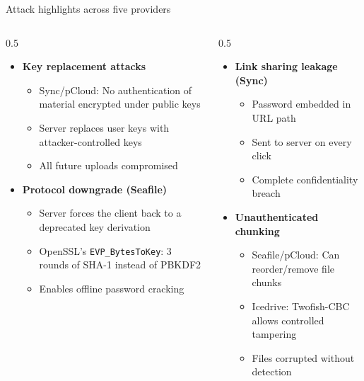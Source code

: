 \ifdefined\PRESENTATION\else\PassOptionsToClass{handout}{beamer}\fi\documentclass[aspectratio=169, lualatex]{beamer}
\begin{document}
\begin{frame}{Attack highlights across five providers}
	\begin{columns}[c]
		\begin{column}{0.5\textwidth}
			\begin{itemize}
				\item \textbf{Key replacement attacks}
				      \begin{itemize}
					      \item Sync/pCloud: No authentication of material encrypted under public keys
					      \item Server replaces user keys with attacker-controlled keys
					      \item All future uploads compromised
				      \end{itemize}
			\end{itemize}
			\vspace{0.3cm}
			\begin{itemize}
				\item \textbf{Protocol downgrade (Seafile)}
				      \begin{itemize}
					      \item Server forces the client back to a deprecated key derivation
					      \item OpenSSL's \texttt{EVP\_BytesToKey}: 3 rounds of SHA-1 instead of PBKDF2
					      \item Enables offline password cracking
				      \end{itemize}
			\end{itemize}
		\end{column}
		\begin{column}{0.5\textwidth}
			\begin{itemize}
				\item \textbf{Link sharing leakage (Sync)}
				      \begin{itemize}
					      \item Password embedded in URL path
					      \item Sent to server on every click
					      \item Complete confidentiality breach
				      \end{itemize}
			\end{itemize}
			\vspace{0.3cm}
			\begin{itemize}
				\item \textbf{Unauthenticated chunking}
				      \begin{itemize}
					      \item Seafile/pCloud: Can reorder/remove file chunks
					      \item Icedrive: Twofish-CBC allows controlled tampering
					      \item Files corrupted without detection
				      \end{itemize}
			\end{itemize}
		\end{column}
	\end{columns}
\end{frame}
\end{document}
